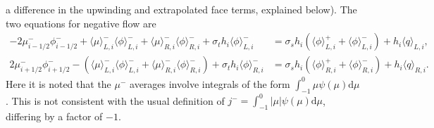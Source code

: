 \documentclass{mc2013}
\renewcommand{\d}{\mathrm{d}}
\newcommand{\mom}[1]{\langle #1 \rangle}
\begin{document}
a difference in the upwinding and extrapolated face terms, explained below). The two
equations for negative flow are
\begin{align}
-2{\mu}_{i-1/2}^- \phi_{i-1/2}^- + \mom {\mu}_{L,i}^- \mom{\phi}_{L,i}^- +  \mom\mu_{R,i}^-
\mom{\phi}_{R,i}^- + \sigma_t h_i \mom{\phi}_{L,i}^- &=  \sigma_s h_i \left( \mom{\phi}_{L,i}^+ +
\mom\phi_{L,i}^-\right) + h_i \mom{q}_{L,i},
\\
2{\mu}_{i+1/2}^- \phi_{i+1/2}^- - \left( \mom\mu_{L,i}^- \mom{\phi}_{L,i}^- +  \mom\mu_{R,i}^-
\mom{\phi}_{R,i}^- \right) + \sigma_t h_i \mom{\phi}_{R,i}^- &=  \sigma_s h_i \left( \mom{\phi}_{R,i}^+ + \mom\phi_{R,i}^-\right) + h_i \mom{q}_{R,i} .
\end{align}
Here it is noted that the ${\mu}^-$ averages involve integrals of the form
$\int_{-1}^0 \mu \psi(\mu) \d \mu$.  This is not consistent with the usual definition
of $j^-= \int_{-1}^0 |\mu|\psi(\mu) \d\mu$, differing by a factor of $-1$.

\label{consist}
\end{document}
